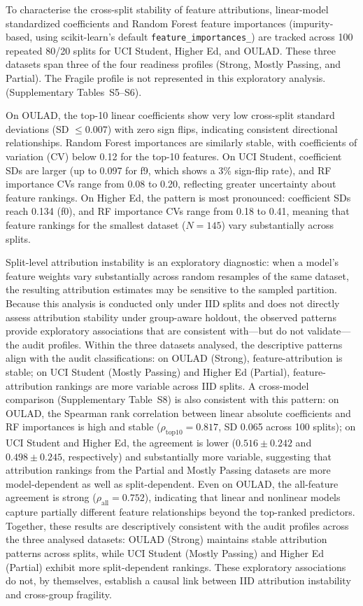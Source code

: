 \documentclass[10pt,letterpaper]{wlscirep}
\begin{document}
To characterise the cross-split stability of feature attributions, linear-model standardized coefficients and Random Forest feature importances (impurity-based, using scikit-learn's default \texttt{feature\_importances\_}) are tracked across 100 repeated 80/20 splits for UCI Student, Higher Ed, and OULAD. These three datasets span three of the four readiness profiles (Strong, Mostly Passing, and Partial). The Fragile profile is not represented in this exploratory analysis. (Supplementary Tables~S5--S6).

On OULAD, the top-10 linear coefficients show very low cross-split standard deviations (SD $\leq 0.007$) with zero sign flips, indicating consistent directional relationships. Random Forest importances are similarly stable, with coefficients of variation (CV) below 0.12 for the top-10 features. On UCI Student, coefficient SDs are larger (up to 0.097 for f9, which shows a 3\% sign-flip rate), and RF importance CVs range from 0.08 to 0.20, reflecting greater uncertainty about feature rankings. On Higher Ed, the pattern is most pronounced: coefficient SDs reach 0.134 (f0), and RF importance CVs range from 0.18 to 0.41, meaning that feature rankings for the smallest dataset ($N=145$) vary substantially across splits.

Split-level attribution instability is an exploratory diagnostic: when a model's feature weights vary substantially across random resamples of the same dataset, the resulting attribution estimates may be sensitive to the sampled partition. Because this analysis is conducted only under IID splits and does not directly assess attribution stability under group-aware holdout, the observed patterns provide exploratory associations that are consistent with---but do not validate---the audit profiles. Within the three datasets analysed, the descriptive patterns align with the audit classifications: on OULAD (Strong), feature-attribution is stable; on UCI Student (Mostly Passing) and Higher Ed (Partial), feature-attribution rankings are more variable across IID splits. A cross-model comparison (Supplementary Table~S8) is also consistent with this pattern: on OULAD, the Spearman rank correlation between linear absolute coefficients and RF importances is high and stable ($\rho_{\mathrm{top10}} = 0.817$, SD 0.065 across 100 splits); on UCI Student and Higher Ed, the agreement is lower ($0.516 \pm 0.242$ and $0.498 \pm 0.245$, respectively) and substantially more variable, suggesting that attribution rankings from the Partial and Mostly Passing datasets are more model-dependent as well as split-dependent. Even on OULAD, the all-feature agreement is strong ($\rho_{\mathrm{all}} = 0.752$), indicating that linear and nonlinear models capture partially different feature relationships beyond the top-ranked predictors. Together, these results are descriptively consistent with the audit profiles across the three analysed datasets: OULAD (Strong) maintains stable attribution patterns across splits, while UCI Student (Mostly Passing) and Higher Ed (Partial) exhibit more split-dependent rankings. These exploratory associations do not, by themselves, establish a causal link between IID attribution instability and cross-group fragility.
\end{document}

